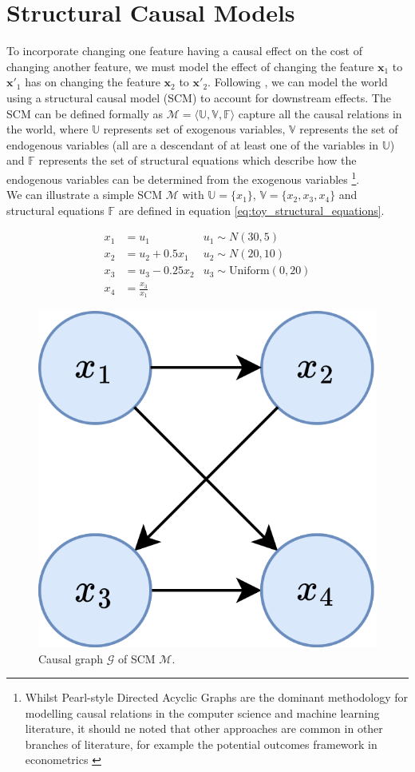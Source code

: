 \section{Structural Causal Models} \label{section:scms}

To incorporate changing one feature having a causal effect on the cost of changing another feature, we must model the effect of changing the feature $\mathbf{x}_1$ to $\mathbf{x'}_1$ has on changing the feature $\mathbf{x}_2$ to $\mathbf{x'}_2$. Following \textcite{karimiAlgorithmicRecourseCounterfactual2021}, we can model the world using a structural causal model (SCM) to account for downstream effects. The SCM can be defined formally as $\mathcal{M} = \langle\mathbb{U, V, F}\rangle$ capture all the causal relations in the world, where $\mathbb{U}$ represents set of exogenous variables, $\mathbb{V}$ represents the set of endogenous variables (all are a descendant of at least one of the variables in $\mathbb{U}$) and $\mathbb{F}$ represents the set of structural equations which describe how the endogenous variables can be determined from the exogenous variables \citep{pearl2016causal}\footnote{Whilst Pearl-style Directed Acyclic Graphs are the dominant methodology for modelling causal relations in the computer science and machine learning literature, it should ne noted that other approaches are common in other branches of literature, for example the potential outcomes framework in econometrics \citep{imbensPotentialOutcomeDirected2020}}.\\

We can illustrate a simple SCM $\mathcal{M}$ with $\mathbb{U} = \{x_1\}$, $\mathbb{V} = \{x_2, x_3, x_4\}$ and structural equations $\mathbb{F}$ are defined in equation \ref{eq:toy_structural_equations}.

\begin{align} \label{eq:toy_structural_equations}
	x_1 & = u_1 & u_1 \sim N(30 , 5) \\ \nonumber %
	x_2 & = u_2 + 0.5x_1 & u_2 \sim N(20, 10) \\ \nonumber %
	x_3 & = u_3 - 0.25x_2 & u_3 \sim \text{Uniform}(0, 20) \\ \nonumber %
	x_4 & = \frac{x_3}{x_1} %
\end{align}


\begin{figure}[!htb]
	\centering
	\includegraphics[width=0.25\linewidth]{images/draw.io/Simple SCM.png}
	\caption{Causal graph $\mathcal{G}$ of SCM $\mathcal{M}$.}
	\label{fig:toy_scm}
\end{figure}



